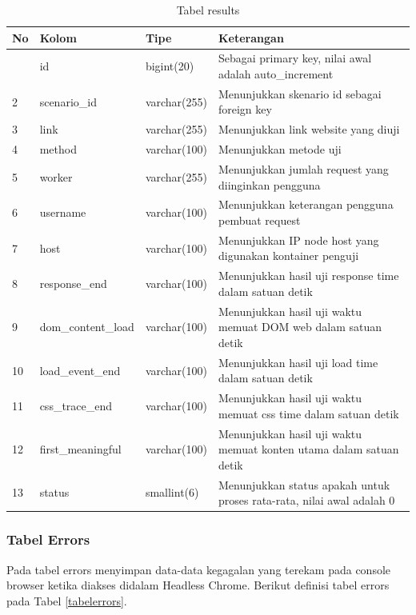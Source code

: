 				\begin{longtable}{|p{}|p{}|p{}|p{}|}
					\caption{Tabel results} \label{tabelresults} \\
					\hline
					\textbf{No} & \textbf{Kolom} & \textbf{Tipe} & \textbf{Keterangan} \\ \hline
					\endhead
					\endfoot
					\endlastfoot
					1 & id & bigint(20) & Sebagai primary key, nilai awal adalah auto\_increment \\ \hline
					2 & scenario\_id & varchar(255) & Menunjukkan skenario id sebagai foreign key \\ \hline
					3 & link & varchar(255) & Menunjukkan link website yang diuji \\ \hline
					4 & method & varchar(100) & Menunjukkan metode uji \\ \hline
					5 & worker & varchar(255) & Menunjukkan jumlah request yang diinginkan pengguna \\ \hline
					6 & username & varchar(100) & Menunjukkan keterangan pengguna pembuat request \\ \hline
					7 & host & varchar(100) & Menunjukkan IP node host yang digunakan kontainer penguji \\ \hline
					8 & response\_end & varchar(100) & Menunjukkan hasil uji response time dalam satuan detik \\ \hline
					9 & dom\_content\_load & varchar(100) & Menunjukkan hasil uji waktu memuat DOM web dalam satuan detik \\ \hline
					10 & load\_event\_end & varchar(100) & Menunjukkan hasil uji load time dalam satuan detik \\ \hline
					11 & css\_trace\_end & varchar(100) & Menunjukkan hasil uji waktu memuat css time dalam satuan detik \\ \hline
					12 & first\_meaningful & varchar(100) & Menunjukkan hasil uji waktu memuat konten utama dalam satuan detik \\ \hline
					13 & status & smallint(6) & Menunjukkan status apakah untuk proses rata-rata, nilai awal adalah 0 \\ \hline
				\end{longtable}
		
			\subsubsection{Tabel Errors}
				Pada tabel errors menyimpan data-data kegagalan yang terekam pada console browser ketika diakses didalam Headless Chrome. Berikut definisi tabel errors pada Tabel \ref{tabelerrors}.
				

